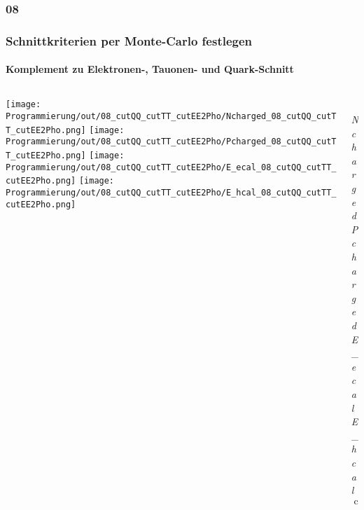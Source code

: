 \documentclass{beamer}
\begin{document}
\subsubsection{08}
\begin{frame}
	\frametitle{Schnittkriterien per Monte-Carlo festlegen}
	\framesubtitle{Komplement zu Elektronen-, Tauonen- und Quark-Schnitt}
	\begin{columns}
		\begin{column}{0.95\textwidth}
			\texttt{[image: Programmierung/out/08\_cutQQ\_cutTT\_cutEE2Pho/Ncharged\_08\_cutQQ\_cutTT\_cutEE2Pho.png]}
			\texttt{[image: Programmierung/out/08\_cutQQ\_cutTT\_cutEE2Pho/Pcharged\_08\_cutQQ\_cutTT\_cutEE2Pho.png]}
			\newline
			\texttt{[image: Programmierung/out/08\_cutQQ\_cutTT\_cutEE2Pho/E\_ecal\_08\_cutQQ\_cutTT\_cutEE2Pho.png]}
			\texttt{[image: Programmierung/out/08\_cutQQ\_cutTT\_cutEE2Pho/E\_hcal\_08\_cutQQ\_cutTT\_cutEE2Pho.png]}
		\end{column}
		\begin{column}{0.2\textwidth}
			\\
			{\color{blue}\textit{Ncharged}}\newline
					\\
			{\color{blue}\textit{Pcharged}}\newline
					\\
			{\color[rgb]{0.6,0.6,0}\textit{E\_ecal}}\newline
					\\
			{\color[rgb]{1,0,1}\textit{E\_hcal}}\newline
					\\
			$\cos\_thet$\newline
					\\
			\\
			\\
			\\
			\\
		\end{column}
	\end{columns}
\end{frame}
\end{document}
